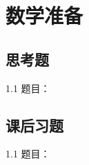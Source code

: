 \chapter{数学准备}

\section{思考题}

\begin{thinking}{1.1}
  题目：\todoanswer

  \begin{solution}
    \todoanswer
  \end{solution}
\end{thinking}

\section{课后习题}

\begin{exercise}{1.1}
  题目：\todoanswer

  \begin{solution}
    \todoanswer
  \end{solution}
\end{exercise}
